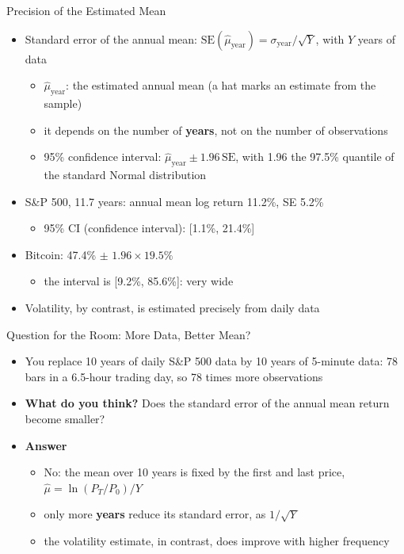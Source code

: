 \begin{frame}{Precision of the Estimated Mean}
\itemsize{\small}
\begin{itemize}
    \item Standard error of the annual mean: $\text{SE}(\hat\mu_{\text{year}}) = \sigma_{\text{year}} / \sqrt{Y}$, with $Y$ years of data
    \begin{itemize}
        \item $\hat\mu_{\text{year}}$: the estimated annual mean (a hat marks an estimate from the sample)
        \item it depends on the number of \textbf{years}, not on the number of observations
        \item 95\% confidence interval: $\hat\mu_{\text{year}} \pm 1.96\,\text{SE}$, with 1.96 the 97.5\% quantile of the standard Normal distribution
    \end{itemize}
    \item S\&P 500, 11.7 years: annual mean log return 11.2\%, SE 5.2\%
    \begin{itemize}
        \item 95\% CI (confidence interval): [1.1\%, 21.4\%]
    \end{itemize}
    \item Bitcoin: 47.4\% $\pm$ $1.96 \times 19.5\%$
    \begin{itemize}
        \item the interval is [9.2\%, 85.6\%]: very wide
    \end{itemize}
    \item Volatility, by contrast, is estimated precisely from daily data
\end{itemize}
\end{frame}

\begin{frame}{Question for the Room: More Data, Better Mean?}
\itemsize{\small}
\begin{itemize}
    \item You replace 10 years of daily S\&P 500 data by 10 years of 5-minute data: 78 bars in a 6.5-hour trading day, so 78 times more observations
    \item \textbf{What do you think?} Does the standard error of the annual mean return become smaller?
    \item \textbf{Answer}
    \begin{itemize}
        \item No: the mean over 10 years is fixed by the first and last price, $\hat\mu = \ln(P_T/P_0)/Y$
        \item only more \textbf{years} reduce its standard error, as $1/\sqrt{Y}$
        \item the volatility estimate, in contrast, does improve with higher frequency
    \end{itemize}
\end{itemize}
\end{frame}

